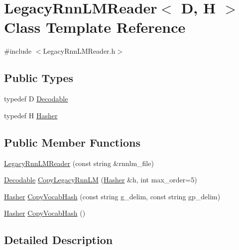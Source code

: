 \hypertarget{class_legacy_rnn_l_m_reader}{}\section{Legacy\+Rnn\+L\+M\+Reader$<$ D, H $>$ Class Template Reference}
\label{class_legacy_rnn_l_m_reader}


{\ttfamily \#include $<$Legacy\+Rnn\+L\+M\+Reader.\+h$>$}

\subsection*{Public Types}
\begin{DoxyCompactItemize}
\item 
typedef D \hyperlink{class_legacy_rnn_l_m_reader_ae3a5ef6d59831a336e91c6933f7af5e9}{Decodable}
\item 
typedef H \hyperlink{class_legacy_rnn_l_m_reader_a9570c6882bd7468cb69e741c266865da}{Hasher}
\end{DoxyCompactItemize}
\subsection*{Public Member Functions}
\begin{DoxyCompactItemize}
\item 
\hyperlink{class_legacy_rnn_l_m_reader_a004a57cdc2488f102a696f2bc2159c54}{Legacy\+Rnn\+L\+M\+Reader} (const string \&rnnlm\+\_\+file)
\item 
\hyperlink{class_legacy_rnn_l_m_reader_ae3a5ef6d59831a336e91c6933f7af5e9}{Decodable} \hyperlink{class_legacy_rnn_l_m_reader_af4aeba65b09cab49c8b212456eb8fbf3}{Copy\+Legacy\+Rnn\+LM} (\hyperlink{class_legacy_rnn_l_m_reader_a9570c6882bd7468cb69e741c266865da}{Hasher} \&h, int max\+\_\+order=5)
\item 
\hyperlink{class_legacy_rnn_l_m_reader_a9570c6882bd7468cb69e741c266865da}{Hasher} \hyperlink{class_legacy_rnn_l_m_reader_a81b53b306d1c76905bfd612ebc2ea645}{Copy\+Vocab\+Hash} (const string g\+\_\+delim, const string gp\+\_\+delim)
\item 
\hyperlink{class_legacy_rnn_l_m_reader_a9570c6882bd7468cb69e741c266865da}{Hasher} \hyperlink{class_legacy_rnn_l_m_reader_a15eda88ef103a1a479f3be09767279bd}{Copy\+Vocab\+Hash} ()
\end{DoxyCompactItemize}


\subsection{Detailed Description}
